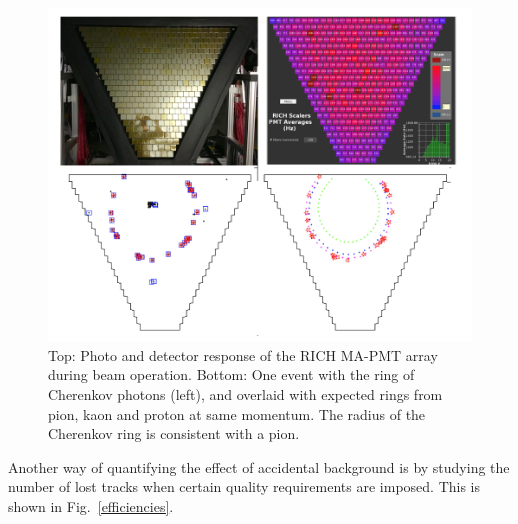 \documentclass[final,3p,twocolumn]{elsarticle}
\begin{document}
\vfill
\begin{figure}[htbp!]
\centerline{\includegraphics[width=1.0\columnwidth]{rich-event.png}}
\caption{\rm  Top: Photo and detector response of the RICH MA-PMT array during beam operation. 
Bottom: One event with the ring of Cherenkov photons (left), and overlaid with expected rings from 
pion, kaon and proton at same momentum. The radius of the Cherenkov ring  is consistent with a pion.  }
\label{rich-event}
\end{figure}

\noindent Another way of quantifying the effect of accidental background is by studying the number of lost tracks when certain quality requirements are imposed. This is shown in Fig.~\ref{efficiencies}.  
\end{document}
